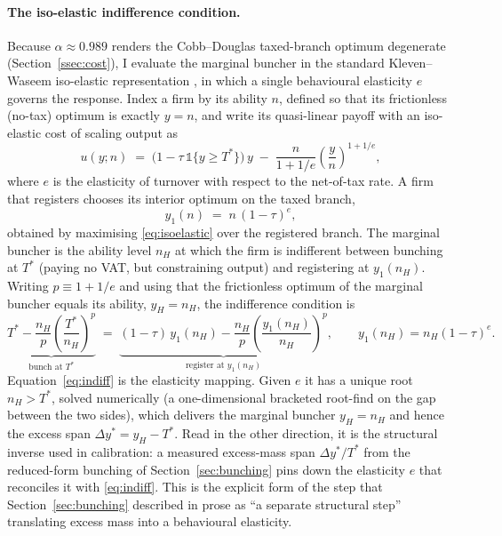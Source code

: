 \paragraph{The iso-elastic indifference condition.} Because
$\alpha\approx0.989$ renders the Cobb--Douglas taxed-branch optimum degenerate
(Section~\ref{ssec:cost}), I evaluate the marginal buncher in the standard
Kleven--Waseem iso-elastic representation \citep{klevenwaseem2013,saez2010},
in which a single behavioural elasticity $e$ governs the response. Index a firm
by its ability $n$, defined so that its frictionless (no-tax) optimum is exactly
$y=n$, and write its quasi-linear payoff with an iso-elastic cost of scaling
output as
\begin{equation}
  u(y;n) \;=\; \bigl(1-\tau\,\mathbb{1}\{y\ge T^{*}\}\bigr)\,y
  \;-\; \frac{n}{1+1/e}\left(\frac{y}{n}\right)^{1+1/e},
  \label{eq:isoelastic}
\end{equation}
where $e$ is the elasticity of turnover with respect to the net-of-tax rate.
A firm that registers chooses its interior optimum on the taxed branch,
\begin{equation}
  y_1(n) \;=\; n\,(1-\tau)^{e},
  \label{eq:postnotch-opt}
\end{equation}
obtained by maximising \eqref{eq:isoelastic} over the registered branch. The
marginal buncher is the ability level $n_H$ at which the firm is indifferent
between bunching at $T^{*}$ (paying no VAT, but constraining output) and
registering at $y_1(n_H)$. Writing $p \equiv 1+1/e$ and using that the
frictionless optimum of the marginal buncher equals its ability, $y_H=n_H$, the
indifference condition is
\begin{equation}
  \underbrace{T^{*} - \frac{n_H}{p}\left(\frac{T^{*}}{n_H}\right)^{\!p}}_{\text{bunch at }T^{*}}
  \;=\;
  \underbrace{(1-\tau)\,y_1(n_H) - \frac{n_H}{p}\left(\frac{y_1(n_H)}{n_H}\right)^{\!p}}_{\text{register at }y_1(n_H)},
  \qquad y_1(n_H)=n_H(1-\tau)^{e}.
  \label{eq:indiff}
\end{equation}
Equation~\eqref{eq:indiff} is the elasticity mapping. Given $e$ it has a unique
root $n_H>T^{*}$, solved numerically (a one-dimensional bracketed root-find on
the gap between the two sides), which delivers the marginal buncher
$y_H=n_H$ and hence the excess span $\Delta y^{*}=y_H-T^{*}$. Read in the other
direction, it is the structural inverse used in calibration: a measured
excess-mass span $\Delta y^{*}/T^{*}$ from the reduced-form bunching of
Section~\ref{sec:bunching} pins down the elasticity $e$ that reconciles it with
\eqref{eq:indiff}. This is the explicit form of the step that
Section~\ref{sec:bunching} described in prose as ``a separate structural step''
translating excess mass into a behavioural elasticity.

